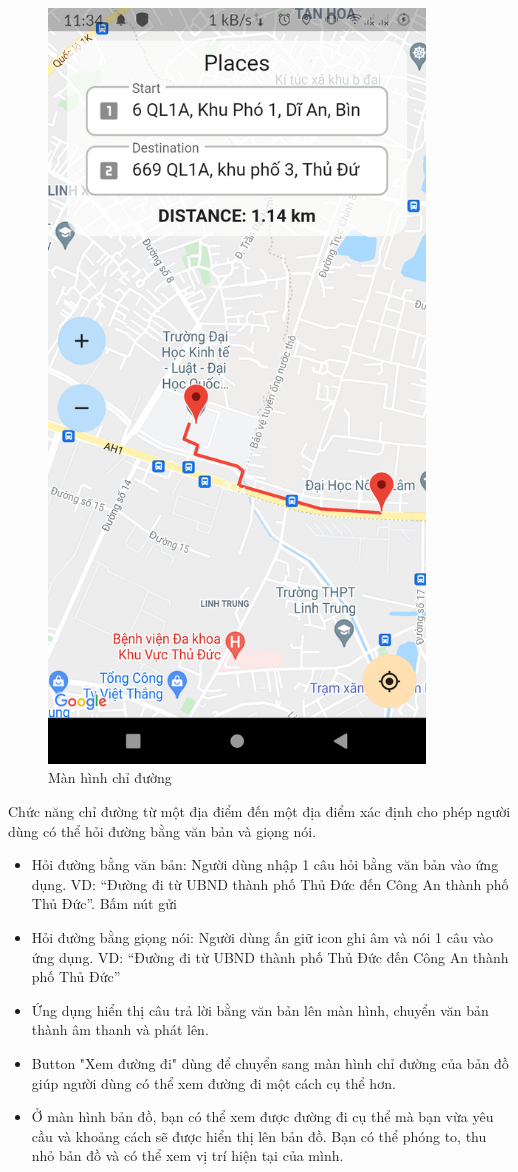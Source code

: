 \begin{figure}[htp]
    \centering
    \includegraphics[width=10cm]{images/Screen-Map.png}
    \caption{Màn hình chỉ đường}
    \label{fig:screen-map}
\end{figure}

Chức năng chỉ đường từ một địa điểm đến một địa điểm xác định cho phép người dùng có thể hỏi đường bằng văn bản và giọng nói.
\begin{itemize}
    \item Hỏi đường bằng văn bản: Người dùng nhập 1 câu hỏi bằng văn bản vào ứng dụng. VD: “Đường đi từ UBND thành phố Thủ Đức đến Công An thành phố Thủ Đức”. Bấm nút gửi
    \item Hỏi đường bằng giọng nói: Người dùng ấn giữ icon ghi âm và nói 1 câu vào ứng dụng. VD: “Đường đi từ UBND thành phố Thủ Đức đến Công An thành phố Thủ Đức”
    \item Ứng dụng hiển thị câu trả lời bằng văn bản lên màn hình, chuyển văn bản thành âm thanh và phát lên.
    \item Button "Xem đường đi" dùng để chuyển sang màn hình chỉ đường của bản đồ giúp người dùng có thể xem đường đi một cách cụ thể hơn.
    \item Ở màn hình bản đồ, bạn có thể xem được đường đi cụ thể mà bạn vừa yêu cầu và khoảng cách sẽ được hiển thị lên bản đồ. Bạn có thể phóng to, thu nhỏ bản đồ và có thể xem vị trí hiện tại của mình.
\end{itemize}